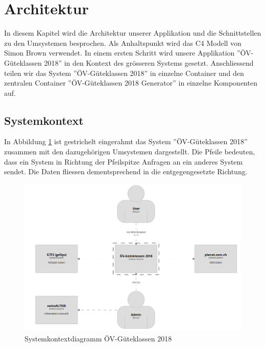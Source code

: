 
\section{Architektur}
\label{Architektur}

In diesem Kapitel wird die Architektur unserer Applikation und die Schnittstellen zu den Umsystemen besprochen.
Als Anhaltspunkt wird das C4 Modell \cite{c4model} von Simon Brown verwendet.
In einem ersten Schritt wird unsere Applikation ''ÖV-Güteklassen 2018'' in den Kontext des grösseren Systems gesetzt.
Anschliessend teilen wir das System ''ÖV-Güteklassen 2018'' in einzelne Container und den zentralen Container ''ÖV-Güteklassen 2018 Generator'' in einzelne Komponenten auf.

\subsection{Systemkontext}
\label{Architektur:Systemkontext}

In Abbildung \ref{fig:system-context-diagram} ist gestrichelt eingerahmt das System ''ÖV-Güteklassen 2018'' zusammen mit den dazugehörigen Umsystemen dargestellt.
Die Pfeile bedeuten, dass ein System in Richtung der Pfeilspitze Anfragen an ein anderes System sendet.
Die Daten fliessen dementsprechend in die entgegengesetzte Richtung.

\begin{figure}[ht]
    \centering
    \includegraphics[width=1\linewidth]{projectdoc/img/systemcontext-diagram.png}
    \caption[Systemkontextdiagramm]{Systemkontextdiagramm ÖV-Güteklassen 2018}
    \label{fig:system-context-diagram}
\end{figure}

